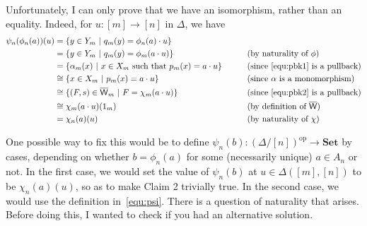 \documentclass[reqno,10pt,a4paper,oneside]{amsart}
\theoremstyle{definition}
\newcommand{\co}{\colon}
\newcommand{\iso}{\cong}
\newcommand{\op}{\mathrm{op}}
\newcommand{\UU}{\overline{\mathsf{W}}}
\newcommand{\Set}{\mathbf{Set}}
\begin{document}
  Unfortunately, I can only prove that we have an isomorphism, rather than an equality. Indeed, for $u \co [m] \to [n]$ in $\Delta$, we have
 \begin{alignat*}{2}
 \psi_n( \phi_n(a)) (u) & =    \{ y \in Y_m \ | \ q_m(y) = \phi_n(a)  \cdot u \} & \qquad &   \\
 & =  \{ y \in Y_m \ | \  q_m(y) = \phi_m(a \cdot u) \} & \qquad &   \text{(by naturality of $\phi$)} \\
  & =  \{ \alpha_m(x) \ | \ x \in X_m  \text{ such  that } p_m(x) = a \cdot u \}& \qquad & \text{(since~\eqref{equ:pbk1} is a pullback)}  \\
  & \iso  \{ x \in X_m \ | \ p_m(x) = a \cdot u \} & & \text{(since $\alpha$ is a monomorphism)}  \\
  & \iso  \{ (F, s) \in \UU_m \ | \ F = \chi_m(a \cdot u) \} &  &\text{(since~\eqref{equ:pbk2} is a pullback)}   \\
  & \iso  \chi_m(a \cdot u)(1_m) & & \text{(by definition of $\UU$)}  \\ 
  & =  \chi_n(a)(u) & & \text{(by naturality of $\chi$)}
    \end{alignat*}

One possible way to fix this would be to define $\psi_n(b) \co (\Delta/[n])^\op \to \Set$ by cases, depending on whether
$b = \phi_n(a)$ for some (necessarily unique) $a \in A_n$ or not. In the first case, we would set the value of $\psi_n(b)$
at $u \in \Delta( [m], [n])$ to be $\chi_n(a)(u)$, so as to make Claim 2 trivially true. In the second case, we would
use the definition in~\eqref{equ:psi}. There is a question of naturality that arises. Before doing this, I wanted to check if you had an alternative solution. 
\end{document}
